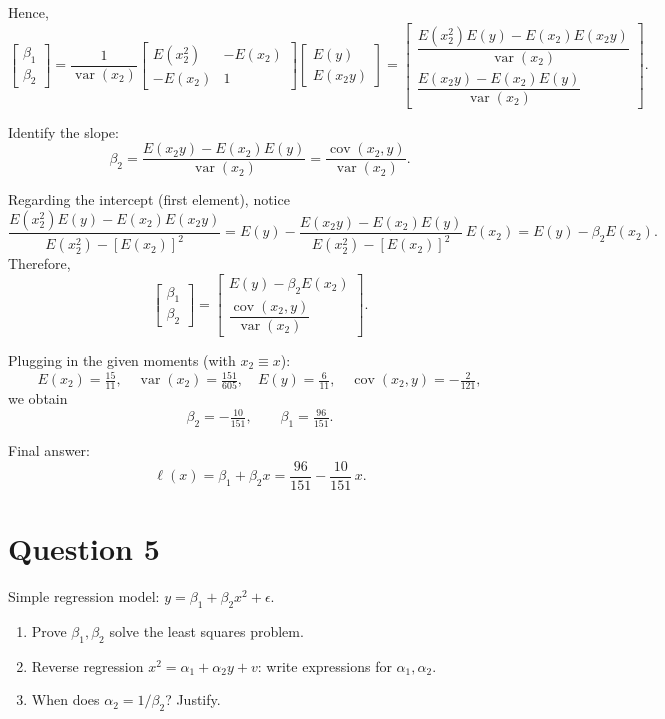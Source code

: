 \documentclass[12pt,a4paper]{article}
\begin{document}
Hence,
\[
\begin{bmatrix}
\beta_1\\ \beta_2
\end{bmatrix}
=
\frac{1}{\operatorname{var}(x_2)}
\begin{bmatrix}
E(x_2^2) & -E(x_2)\\
- E(x_2) & 1
\end{bmatrix}
\begin{bmatrix}
E(y)\\
E(x_2y)
\end{bmatrix}
=
\begin{bmatrix}
\dfrac{E(x_2^2)E(y)-E(x_2)E(x_2y)}{\operatorname{var}(x_2)}\\[10pt]
\dfrac{E(x_2y)-E(x_2)E(y)}{\operatorname{var}(x_2)}
\end{bmatrix}.
\]

Identify the slope:
\[
\beta_2=\frac{E(x_2y)-E(x_2)E(y)}{\operatorname{var}(x_2)}
=\frac{\operatorname{cov}(x_2,y)}{\operatorname{var}(x_2)}.
\]

Regarding the intercept (first element), notice
\[
\frac{E(x_2^2)E(y)-E(x_2)E(x_2y)}{E(x_2^2)-[E(x_2)]^2}
=
E(y)-\frac{E(x_2y)-E(x_2)E(y)}{E(x_2^2)-[E(x_2)]^2}\,E(x_2)
=E(y)-\beta_2E(x_2).
\]
Therefore,
\[
\begin{bmatrix}
\beta_1\\ \beta_2
\end{bmatrix}
=
\begin{bmatrix}
E(y)-\beta_2E(x_2)\\[4pt]
\dfrac{\operatorname{cov}(x_2,y)}{\operatorname{var}(x_2)}
\end{bmatrix}.
\]

Plugging in the given moments (with $x_2\equiv x$):
\[
E(x_2)=\tfrac{15}{11},\quad 
\operatorname{var}(x_2)=\tfrac{151}{605},\quad 
E(y)=\tfrac{6}{11},\quad 
\operatorname{cov}(x_2,y)=-\tfrac{2}{121},
\]
we obtain
\[
\beta_2=-\tfrac{10}{151},\qquad
\beta_1=\tfrac{96}{151}.
\]

Final answer:
\[
\ell(x)=\beta_1+\beta_2 x
=\frac{96}{151}-\frac{10}{151}\,x.
\]

\section*{Question 5}
Simple regression model: $y = \beta_1 + \beta_2 x^2 + \epsilon$.

\begin{enumerate}[label=(\alph*)]
  \item Prove $\beta_1,\beta_2$ solve the least squares problem.  
  \item Reverse regression $x^2 = \alpha_1 + \alpha_2 y + v$: write expressions for $\alpha_1,\alpha_2$.  
  \item When does $\alpha_2 = 1/\beta_2$? Justify.
\end{enumerate}
\end{document}

